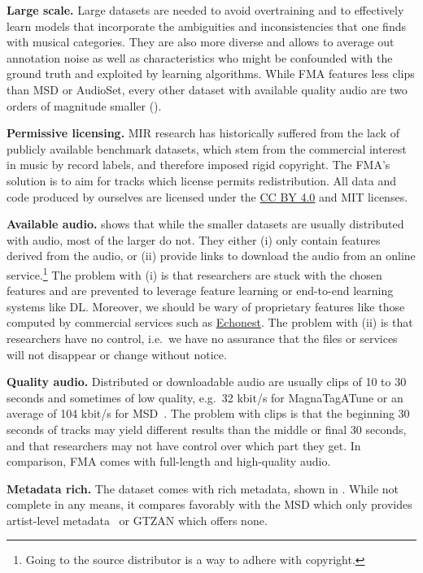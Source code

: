 \documentclass{article}
\begin{document}
\textbf{Large scale.} Large datasets are needed to avoid overtraining and to effectively learn models that incorporate the ambiguities and inconsistencies that one finds with musical categories. They are also more diverse and allows to average out annotation noise as well as characteristics who might be confounded with the ground truth and exploited by learning algorithms.
While FMA features less clips than MSD or AudioSet, every other dataset with available quality audio are two orders of magnitude smaller ().

\textbf{Permissive licensing.} MIR research has historically suffered from the lack of publicly available benchmark datasets, which stem from the commercial interest in music by record labels, and therefore imposed rigid copyright.
The FMA's solution is to aim for tracks which license permits redistribution.
All data and code produced by ourselves are licensed under the \href{https://creativecommons.org/licenses/by/4.0)}{CC BY 4.0} and MIT licenses.

\textbf{Available audio.}
 shows that while the smaller datasets are usually distributed with audio, most of the larger do not. They either (i) only contain features derived from the audio, or (ii) provide links to download the audio from an online service.\footnote{Going to the source distributor is a way to adhere with copyright.}
The problem with (i) is that researchers are stuck with the chosen features and are prevented to leverage feature learning or end-to-end learning systems like DL. Moreover, we should be wary of proprietary features like those computed by commercial services such as \href{http://the.echonest.com/}{Echonest}.
The problem with (ii) is that researchers have no control, i.e.\ we have no assurance that the files or services will not disappear or change without notice.

\textbf{Quality audio.} %
Distributed or downloadable audio are usually clips of 10 to 30 seconds and sometimes of low quality, e.g.\ 32 kbit/s for MagnaTagATune or an average of 104 kbit/s for MSD~\cite{msd_features}. The problem with clips is that the beginning 30 seconds of tracks may yield different results than the middle or final 30 seconds, and that researchers may not have control over which part they get.
In comparison, FMA comes with full-length and high-quality audio.

\textbf{Metadata rich.} The dataset comes with rich metadata, shown in . While not complete in any means, it compares favorably with the MSD which only provides artist-level metadata~\cite{msd} or GTZAN which offers none.
\end{document}
